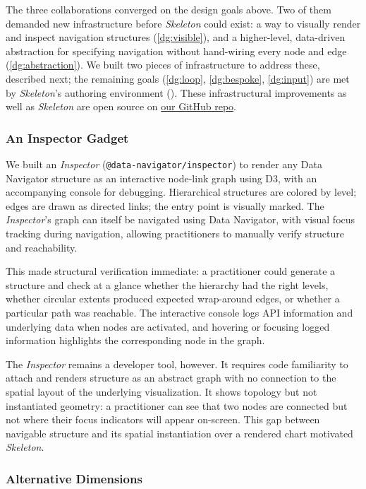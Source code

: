 \documentclass[12pt]{cmuthesis}
\begin{document}
%
The three collaborations converged on the design goals above. Two of them demanded new infrastructure before \textit{Skeleton} could exist: a way to visually render and inspect navigation structures (\ref{dg:visible}), and a higher-level, data-driven abstraction for specifying navigation without hand-wiring every node and edge (\ref{dg:abstraction}). We built two pieces of infrastructure to address these, described next; the remaining goals (\ref{dg:loop}, \ref{dg:bespoke}, \ref{dg:input}) are met by \textit{Skeleton}'s authoring environment (). These infrastructural improvements as well as \textit{Skeleton} are open source on \href{https://github.com/cmudig/data-navigator}{our GitHub repo}.

\subsubsection{An Inspector Gadget}

We built an \textit{Inspector} (\texttt{@data-navigator/inspector}) to render any Data Navigator structure as an interactive node-link graph using D3, with an accompanying console for debugging. Hierarchical structures are colored by level; edges are drawn as directed links; the entry point is visually marked. The \textit{Inspector}'s graph can itself be navigated using Data Navigator, with visual focus tracking during navigation, allowing practitioners to manually verify structure and reachability.

This made structural verification immediate: a practitioner could generate a structure and check at a glance whether the hierarchy had the right levels, whether circular extents produced expected wrap-around edges, or whether a particular path was reachable. The interactive console logs API information and underlying data when nodes are activated, and hovering or focusing logged information highlights the corresponding node in the graph.

The \textit{Inspector} remains a developer tool, however. It requires code familiarity to attach and renders structure as an abstract graph with no connection to the spatial layout of the underlying visualization. It shows topology but not instantiated geometry: a practitioner can see that two nodes are connected but not where their focus indicators will appear on-screen. This gap between navigable structure and its spatial instantiation over a rendered chart motivated \textit{Skeleton}.

\subsubsection{Alternative Dimensions}
\end{document}
